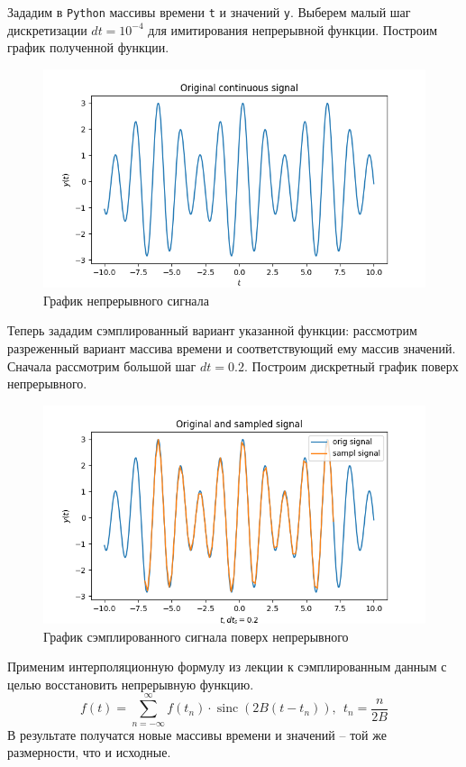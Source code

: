 \documentclass[a4paper, 12pt]{article}
\DeclareMathOperator{\sinc}{sinc}
\begin{document}
    Зададим в \texttt{Python} массивы времени \texttt{t} и значений \texttt{y}. Выберем малый шаг дискретизации $dt=10^{-4}$ для
    имитирования непрерывной функции. Построим график полученной функции.
    \begin{figure}[H]
        \centering
        \includegraphics[scale=0.45]{orig1.png}
        \captionsetup{skip=0pt}
        \caption{График непрерывного сигнала}
        \label{fig:orig1}
    \end{figure}


    Теперь зададим сэмплированный вариант указанной функции: рассмотрим
    разреженный вариант массива времени и соответствующий ему массив значений.
    Сначала рассмотрим большой шаг $dt=0.2$.
    Построим дискретный график поверх непрерывного.
    \begin{figure}[H]
        \centering
        \includegraphics[scale=0.45]{1_sine.png}
        \captionsetup{skip=0pt}
        \caption{График сэмплированного сигнала поверх непрерывного}
        \label{fig:1sine}
    \end{figure}


    Применим интерполяционную формулу из лекции к сэмплированным
    данным с целью восстановить непрерывную функцию.
    $$
    f(t)=\sum\limits_{n=-\infty}^{\infty}f(t_n)\cdot\sinc{(2B(t-t_n))},\ \ t_n=\dfrac{n}{2B}
    $$
    В результате получатся новые массивы времени и значений -- той же размерности, что и исходные.
\end{document}
